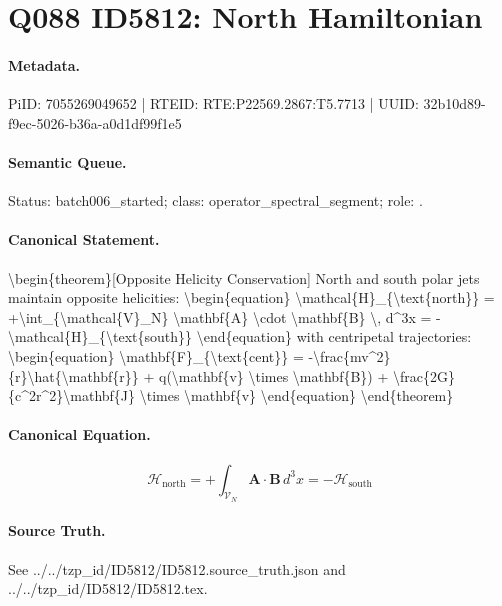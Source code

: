 \section*{Q088 ID5812: North Hamiltonian}
\paragraph{Metadata.}
PiID: 7055269049652 | RTEID: RTE:P22569.2867:T5.7713 | UUID: 32b10d89-f9ec-5026-b36a-a0d1df99f1e5

\paragraph{Semantic Queue.}
Status: batch006\_started; class: operator\_spectral\_segment; role: .

\paragraph{Canonical Statement.}
\textbackslash{}begin\{theorem\}[Opposite Helicity Conservation] North and south polar jets maintain opposite helicities: \textbackslash{}begin\{equation\} \textbackslash{}mathcal\{H\}\_\{\textbackslash{}text\{north\}\} = +\textbackslash{}int\_\{\textbackslash{}mathcal\{V\}\_N\} \textbackslash{}mathbf\{A\} \textbackslash{}cdot \textbackslash{}mathbf\{B\} \textbackslash{}, d\textasciicircum{}3x = -\textbackslash{}mathcal\{H\}\_\{\textbackslash{}text\{south\}\} \textbackslash{}end\{equation\} with centripetal trajectories: \textbackslash{}begin\{equation\} \textbackslash{}mathbf\{F\}\_\{\textbackslash{}text\{cent\}\} = -\textbackslash{}frac\{mv\textasciicircum{}2\}\{r\}\textbackslash{}hat\{\textbackslash{}mathbf\{r\}\} + q(\textbackslash{}mathbf\{v\} \textbackslash{}times \textbackslash{}mathbf\{B\}) + \textbackslash{}frac\{2G\}\{c\textasciicircum{}2r\textasciicircum{}2\}\textbackslash{}mathbf\{J\} \textbackslash{}times \textbackslash{}mathbf\{v\} \textbackslash{}end\{equation\} \textbackslash{}end\{theorem\}

\paragraph{Canonical Equation.}
\[
\begin{equation} \mathcal{H}_{\text{north}} = +\int_{\mathcal{V}_N} \mathbf{A} \cdot \mathbf{B} \, d^3x = -\mathcal{H}_{\text{south}} \end{equation}
\]

\paragraph{Source Truth.}
See ../../tzp\_id/ID5812/ID5812.source\_truth.json and ../../tzp\_id/ID5812/ID5812.tex.
